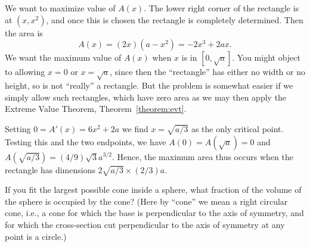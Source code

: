 \begin{solution}
We want to maximize value of $A(x)$.  The lower right corner of the
rectangle is at $(x,x^2)$, and once this is chosen the rectangle is
completely determined. Then the area is
\[
A(x)=(2x)(a-x^2)=-2x^3+2ax.
\] 
We want the maximum value of $A(x)$ when $x$ is in $[0,\sqrt{a}]$. You
might object to allowing $x=0$ or $x=\sqrt{a}$, since then the
``rectangle'' has either no width or no height, so is not ``really'' a
rectangle. But the problem is somewhat easier if we simply allow such
rectangles, which have zero area as we may then apply the Extreme
Value Theorem, Theorem~\ref{theorem:evt}.

Setting $0=A'(x)=6x^2+2a$ we find $x=\sqrt{a/3}$ as the only critical
point. Testing this and the two endpoints, we have
$A(0)=A(\sqrt{a})=0$ and $A(\sqrt{a/3})=(4/9)\sqrt{3}a^{3/2}$. Hence,
the maximum area thus occurs when the rectangle has dimensions
$2\sqrt{a/3}\times (2/3)a$.
\end{solution}


\begin{example}
If you fit the largest possible cone inside a sphere, what fraction of the
volume of the sphere is occupied by the cone?  (Here by ``cone'' we mean a
right circular cone, i.e., a cone for which the base is perpendicular to
the axis of symmetry, and for which the cross-section cut perpendicular to
the axis of symmetry at any point is a circle.)
\end{example}

